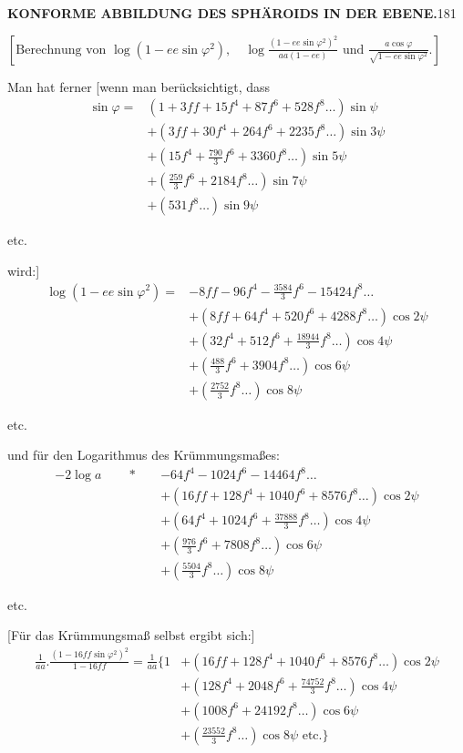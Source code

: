 \par\clearpage
\noindent\null\hfill{\small\textbf{KONFORME ABBILDUNG DES SPHÄROIDS IN DER EBENE.}}\hfill181\par\medskip
{\centering [27.]\par\medskip
\(\left[\text{Berechnung von }\log(1-ee\sin\varphi^2),\quad
\log\frac{(1-ee\sin\varphi^2)^2}{aa(1-ee)}\text{ und }\frac{a\cos\varphi}{\sqrt{1-ee\sin\varphi^2}}.\right]\)\par}
Man hat ferner [wenn man berücksichtigt, dass
\[
\begin{aligned}
\sin\varphi={}&(1+3ff+15f^4+87f^6+528f^8\ldots)\sin\psi\\
&+(3ff+30f^4+264f^6+2235f^8\ldots)\sin3\psi\\
&+(15f^4+\tfrac{790}{3}f^6+3360f^8\ldots)\sin5\psi\\
&+(\tfrac{259}{3}f^6+2184f^8\ldots)\sin7\psi\\
&+(531f^8\ldots)\sin9\psi
\end{aligned}
\]
{\centering etc.\par}
\noindent wird:]
\[
\begin{aligned}
\log(1-ee\sin\varphi^2)={}&-8ff-96f^4-\tfrac{3584}{3}f^6-15424f^8\ldots\\
&+(8ff+64f^4+520f^6+4288f^8\ldots)\cos2\psi\\
&+(32f^4+512f^6+\tfrac{18944}{3}f^8\ldots)\cos4\psi\\
&+(\tfrac{488}{3}f^6+3904f^8\ldots)\cos6\psi\\
&+(\tfrac{2752}{3}f^8\ldots)\cos8\psi
\end{aligned}
\]
{\centering etc.\par}
\noindent und für den Logarithmus des Krümmungsmaßes:
\[
\begin{aligned}
-2\log a\qquad\ast\quad&-64f^4-1024f^6-14464f^8\ldots\\
&+(16ff+128f^4+1040f^6+8576f^8\ldots)\cos2\psi\\
&+(64f^4+1024f^6+\tfrac{37888}{3}f^8\ldots)\cos4\psi\\
&+(\tfrac{976}{3}f^6+7808f^8\ldots)\cos6\psi\\
&+(\tfrac{5504}{3}f^8\ldots)\cos8\psi
\end{aligned}
\]
{\centering etc.\par}
[Für das Krümmungsmaß selbst ergibt sich:]
\[
\begin{aligned}
\frac1{aa}.\frac{(1-16ff\sin\varphi^2)^2}{1-16ff}=\frac1{aa}\biggl\{1&+(16ff+128f^4+1040f^6+8576f^8\ldots)\cos2\psi\\
&+(128f^4+2048f^6+\tfrac{74752}{3}f^8\ldots)\cos4\psi\\
&+(1008f^6+24192f^8\ldots)\cos6\psi\\
&+(\tfrac{23552}{3}f^8\ldots)\cos8\psi\text{ etc.}\biggr\}
\end{aligned}
\]
